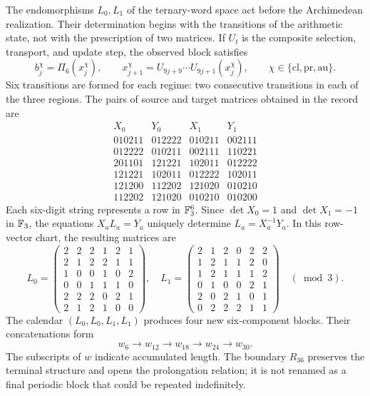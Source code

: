 The endomorphisms \(L_0,L_1\) of the ternary-word space act before the Archimedean realization. Their determination begins with the transitions of the arithmetic state, not with the prescription of two matrices. If \(U_t\) is the composite selection, transport, and update step, the observed block satisfies
\[
 b_j^\chi=\Pi_6(x_j^\chi),\qquad
 x_{j+1}^\chi=U_{9j+9}\cdots U_{9j+1}(x_j^\chi),
 \qquad \chi\in\{\mathrm{cl},\mathrm{pr},\mathrm{au}\}.
\]
Six transitions are formed for each regime: two consecutive transitions in each of the three regions. The pairs of source and target matrices obtained in the record are
\[
\begin{array}{c|c|c|c}
X_0&Y_0&X_1&Y_1\\\hline
010211&012222&010211&002111\\
012222&010211&002111&110221\\
201101&121221&102011&012222\\
121221&102011&012222&102011\\
121200&112202&121020&010210\\
112202&121020&010210&010200
\end{array}
\]
Each six-digit string represents a row in \(\mathbb F_3^6\). Since \(\det X_0=1\) and \(\det X_1=-1\) in \(\mathbb F_3\), the equations \(X_aL_a=Y_a\) uniquely determine \(L_a=X_a^{-1}Y_a\). In this row-vector chart, the resulting matrices are
\[
 L_0=\begin{pmatrix}
 2&2&2&1&2&1\\2&1&2&2&1&1\\1&0&0&1&0&2\\
 0&0&1&1&1&0\\2&2&2&0&2&1\\2&1&2&1&0&0
 \end{pmatrix},\quad
 L_1=\begin{pmatrix}
 2&1&2&0&2&2\\1&2&1&1&2&0\\1&2&1&1&1&2\\
 0&1&0&0&2&1\\2&0&2&1&0&1\\0&2&2&2&1&1
 \end{pmatrix}\quad(\bmod3).
\]
The calendar \((L_0,L_0,L_1,L_1)\) produces four new six-component blocks. Their concatenations form
\[
 w_6\longrightarrow w_{12}\longrightarrow w_{18}
 \longrightarrow w_{24}\longrightarrow w_{30}.
\]
The subscripts of \(w\) indicate accumulated length. The boundary \(R_{36}\) preserves the terminal structure and opens the prolongation relation; it is not renamed as a final periodic block that could be repeated indefinitely.

